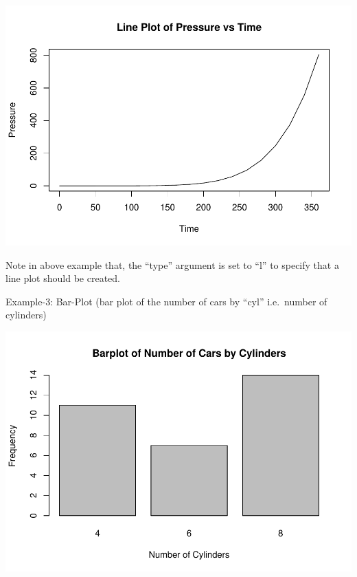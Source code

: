 \documentclass[
]{book}
\newenvironment{Shaded}{\begin{snugshade}}{\end{snugshade}}
\newcommand{\AttributeTok}[1]{\textcolor[rgb]{0.13,0.29,0.53}{#1}}
\newcommand{\FunctionTok}[1]{\textcolor[rgb]{0.13,0.29,0.53}{\textbf{#1}}}
\newcommand{\NormalTok}[1]{#1}
\newcommand{\SpecialCharTok}[1]{\textcolor[rgb]{0.81,0.36,0.00}{\textbf{#1}}}
\newcommand{\StringTok}[1]{\textcolor[rgb]{0.31,0.60,0.02}{#1}}
\begin{document}
\begin{center}\includegraphics[height=0.55\textheight]{DauR_files/figure-latex/p2-1} \end{center}

Note in above example that, the ``type'' argument is set to ``l'' to specify that a line plot should be created.

Example-3: Bar-Plot (bar plot of the number of cars by ``cyl'' i.e.~number of cylinders)

\begin{Shaded}
\end{Shaded}

\begin{center}\includegraphics[height=0.55\textheight]{DauR_files/figure-latex/p3-1} \end{center}
\end{document}
